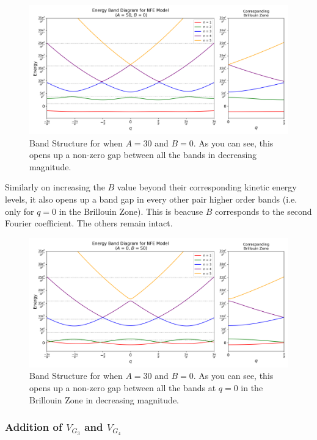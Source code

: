 \documentclass[12pt,a4paper]{article}
\begin{document}
\begin{figure}[H]
    \centering
    \includegraphics[width=1\linewidth]{images/h1.png}
    \caption{Band Structure for when $A=30$ and $B=0$. As you can see, this opens up a non-zero gap between all the bands in decreasing magnitude.}
    \label{h1}
\end{figure}

Similarly on increasing the $B$ value beyond their corresponding kinetic energy levels, it also opens up a band gap in every other pair higher order bands (i.e. only for $q=0$ in the Brillouin Zone). This is beacuse $B$ corresponds to the second Fourier coefficient. The others remain intact.

\begin{figure}[H]
    \centering
    \includegraphics[width=1\linewidth]{images/h2.png}
    \caption{Band Structure for when $A=30$ and $B=0$. As you can see, this opens up a non-zero gap between all the bands at $q=0$ in the Brillouin Zone in decreasing magnitude.}
    \label{h2}
\end{figure}

\subsubsection{Addition of $V_{G_3}$ and $V_{G_4}$}
\end{document}

